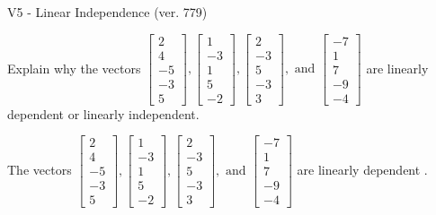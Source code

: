\begin{exercise}
  \begin{exerciseTitle}V5 - Linear Independence (ver. 779)\end{exerciseTitle}
  \begin{exerciseStatement}
    Explain why the vectors \(\left[\begin{array}{r}
2 \\
4 \\
-5 \\
-3 \\
5
\end{array}\right] , \left[\begin{array}{r}
1 \\
-3 \\
1 \\
5 \\
-2
\end{array}\right] , \left[\begin{array}{r}
2 \\
-3 \\
5 \\
-3 \\
3
\end{array}\right] , \text{ and } \left[\begin{array}{r}
-7 \\
1 \\
7 \\
-9 \\
-4
\end{array}\right]\) are linearly dependent or linearly independent.	


  \end{exerciseStatement}
  \begin{exerciseAnswer}
   The vectors \(\left[\begin{array}{r}
2 \\
4 \\
-5 \\
-3 \\
5
\end{array}\right] , \left[\begin{array}{r}
1 \\
-3 \\
1 \\
5 \\
-2
\end{array}\right] , \left[\begin{array}{r}
2 \\
-3 \\
5 \\
-3 \\
3
\end{array}\right] , \text{ and } \left[\begin{array}{r}
-7 \\
1 \\
7 \\
-9 \\
-4
\end{array}\right]\) are 
  	 linearly dependent  .
  


  \end{exerciseAnswer}
\end{exercise}
